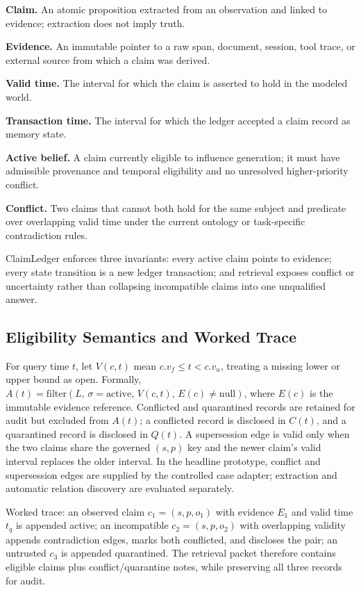 \textbf{Claim.} An atomic proposition extracted from an observation and linked to evidence; extraction does not imply truth.

\textbf{Evidence.} An immutable pointer to a raw span, document, session, tool trace, or external source from which a claim was derived.

\textbf{Valid time.} The interval for which the claim is asserted to hold in the modeled world.

\textbf{Transaction time.} The interval for which the ledger accepted a claim record as memory state.

\textbf{Active belief.} A claim currently eligible to influence generation; it must have admissible provenance and temporal eligibility and no unresolved higher-priority conflict.

\textbf{Conflict.} Two claims that cannot both hold for the same subject and predicate over overlapping valid time under the current ontology or task-specific contradiction rules.

ClaimLedger enforces three invariants: every active claim points to evidence; every state transition is a new ledger transaction; and retrieval exposes conflict or uncertainty rather than collapsing incompatible claims into one unqualified answer.

\subsection{Eligibility Semantics and Worked Trace}\label{sec:semantics-trace}

For query time $t$, let $V(c,t)$ mean $c.v_f\le t<c.v_u$, treating a missing lower or upper bound as open. Formally, $A(t)=\mathrm{filter}(L,\,\sigma=\mathrm{active},\,V(c,t),\,E(c)\ne\mathrm{null})$, where $E(c)$ is the immutable evidence reference. Conflicted and quarantined records are retained for audit but excluded from $A(t)$; a conflicted record is disclosed in $C(t)$, and a quarantined record is disclosed in $Q(t)$. A supersession edge is valid only when the two claims share the governed $(s,p)$ key and the newer claim's valid interval replaces the older interval. In the headline prototype, conflict and supersession edges are supplied by the controlled case adapter; extraction and automatic relation discovery are evaluated separately.

Worked trace: an observed claim $c_1=(s,p,o_1)$ with evidence $E_1$ and valid time $t_q$ is appended active; an incompatible $c_2=(s,p,o_2)$ with overlapping validity appends contradiction edges, marks both conflicted, and discloses the pair; an untrusted $c_3$ is appended quarantined. The retrieval packet therefore contains eligible claims plus conflict/quarantine notes, while preserving all three records for audit.

